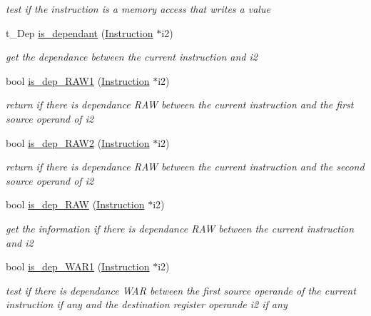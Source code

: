 \begin{DoxyCompactItemize}
\begin{DoxyCompactList}\small\item\em test if the instruction is a memory access that writes a value \end{DoxyCompactList}\item 
t\+\_\+\+Dep \hyperlink{class_instruction_ac8d86b800140a08cb03d82f83f363fa4}{is\+\_\+dependant} (\hyperlink{class_instruction}{Instruction} $\ast$i2)
\begin{DoxyCompactList}\small\item\em get the dependance between the current instruction and i2 \end{DoxyCompactList}\item 
bool \hyperlink{class_instruction_ae5d54f535adab416c53eb0ff6a438804}{is\+\_\+dep\+\_\+\+R\+A\+W1} (\hyperlink{class_instruction}{Instruction} $\ast$i2)
\begin{DoxyCompactList}\small\item\em return if there is dependance R\+A\+W between the current instruction and the first source operand of i2 \end{DoxyCompactList}\item 
bool \hyperlink{class_instruction_aa28ae5f427ee02c96466f1ac68060f87}{is\+\_\+dep\+\_\+\+R\+A\+W2} (\hyperlink{class_instruction}{Instruction} $\ast$i2)
\begin{DoxyCompactList}\small\item\em return if there is dependance R\+A\+W between the current instruction and the second source operand of i2 \end{DoxyCompactList}\item 
bool \hyperlink{class_instruction_a4c902c5a8fdc8c8841ec24f389605fd5}{is\+\_\+dep\+\_\+\+R\+A\+W} (\hyperlink{class_instruction}{Instruction} $\ast$i2)
\begin{DoxyCompactList}\small\item\em get the information if there is dependance R\+A\+W between the current instruction and i2 \end{DoxyCompactList}\item 
bool \hyperlink{class_instruction_a36c0faedd74af14b403ba7063af5d07f}{is\+\_\+dep\+\_\+\+W\+A\+R1} (\hyperlink{class_instruction}{Instruction} $\ast$i2)
\begin{DoxyCompactList}\small\item\em test if there is dependance W\+A\+R between the first source operande of the current instruction if any and the destination register operande i2 if any \end{DoxyCompactList}\item 

\end{DoxyCompactItemize}
